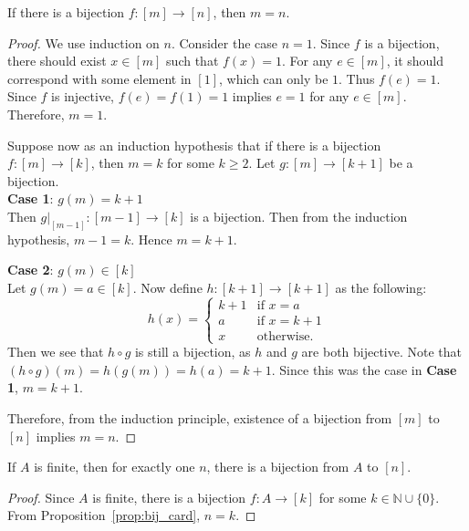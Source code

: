 \documentclass[../main.tex]{subfiles}
\begin{document}
\begin{prop} \label{prop:bij_card}
    If there is a bijection $f: [m] \rightarrow [n]$, then $m = n$.
\end{prop}
\begin{proof}
    We use induction on $n$.
    Consider the case $n = 1$.
    Since $f$ is a bijection, there should exist $x \in [m]$ such that $f(x) = 1$.
    For any $e \in [m]$, it should correspond with some element in $[1]$, which can only be $1$.
    Thus $f(e) = 1$.
    Since $f$ is injective, $f(e) = f(1) = 1$ implies $e = 1$ for any $e \in [m]$.
    Therefore, $m = 1$.

    Suppose now as an induction hypothesis that if there is a bijection $f: [m] \rightarrow [k]$, then $m = k$ for some $k \geq 2$.
    Let $g: [m] \rightarrow [k+1]$ be a bijection.\\
    \textbf{Case 1}: $g(m) = k+1$\\
    \indent Then $g|_{[m - 1]}: [m - 1] \rightarrow [k]$ is a bijection.
    Then from the induction hypothesis, $m - 1 = k$.
    Hence $m = k + 1$.

    \noindent \textbf{Case 2}: $g(m) \in [k]$\\
    \indent Let $g(m) = a \in [k]$.
    Now define $h: [k + 1] \rightarrow [k + 1]$ as the following:
    \[
        h(x) = \begin{cases}
            k + 1 &\text{if }x = a\\
            a &\text{if }x = k + 1\\
            x &\text{otherwise}.
        \end{cases}
    \]
    Then we see that $h \circ g$ is still a bijection, as $h$ and $g$ are both bijective.
    Note that $(h \circ g)(m) = h(g(m)) = h(a) = k + 1$.
    Since this was the case in \textbf{Case 1}, $m = k + 1$.

    Therefore, from the induction principle, existence of a bijection from $[m]$ to $[n]$ implies $m = n$.
\end{proof}

\begin{cor} \label{cor:finite_bij}
    If $A$ is finite, then for exactly one $n$, there is a bijection from $A$ to $[n]$.
\end{cor}
\begin{proof}
    Since $A$ is finite, there is a bijection $f: A \rightarrow [k]$ for some $k \in \mathbb{N} \cup \{0\}$.
    From Proposition~\ref{prop:bij_card}, $n = k$.
\end{proof}
\end{document}
